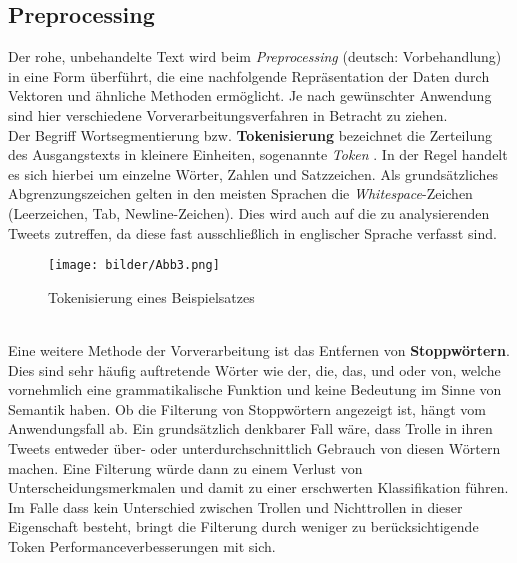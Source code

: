 \subsection{Preprocessing}
Der rohe, unbehandelte Text wird beim \textit{Preprocessing} (deutsch: Vorbehandlung) in eine Form überführt, die eine nachfolgende Repräsentation der Daten durch Vektoren und ähnliche Methoden ermöglicht. Je nach gewünschter Anwendung sind hier verschiedene Vorverarbeitungsverfahren in Betracht zu ziehen.\\
Der Begriff Wortsegmentierung bzw. \textbf{Tokenisierung} bezeichnet die Zerteilung des Ausgangstexts in kleinere Einheiten, sogenannte \textit{Token} \citep{MannSch99}. In der Regel handelt es sich hierbei um einzelne Wörter, Zahlen und Satzzeichen. Als grundsätzliches Abgrenzungszeichen gelten in den meisten Sprachen die \textit{Whitespace}-Zeichen (Leerzeichen, Tab, Newline-Zeichen). Dies wird auch auf die zu analysierenden Tweets zutreffen, da diese fast ausschließlich in englischer Sprache verfasst sind.\\
\begin{figure}[htb]
	\begin{center}
		\texttt{[image: bilder/Abb3.png]}
		\caption{Tokenisierung eines Beispielsatzes}\label{tokenization}
	\end{center}
\end{figure}\\
Eine weitere Methode der Vorverarbeitung ist das Entfernen von \textbf{Stoppwörtern}. Dies sind sehr häufig auftretende Wörter wie \glqq der\grqq, \glqq die\grqq, \glqq das\grqq, \glqq und\grqq{} oder \glqq von\grqq, welche vornehmlich eine grammatikalische Funktion und keine Bedeutung im Sinne von Semantik haben. Ob die Filterung von Stoppwörtern angezeigt ist, hängt vom Anwendungsfall ab. Ein grundsätzlich denkbarer Fall wäre, dass Trolle in ihren Tweets entweder über- oder unterdurchschnittlich Gebrauch von diesen Wörtern machen. Eine Filterung würde dann zu einem Verlust von Unterscheidungsmerkmalen und damit zu einer erschwerten Klassifikation führen. Im Falle dass kein Unterschied zwischen Trollen und Nichttrollen in dieser Eigenschaft besteht, bringt die Filterung durch weniger zu berücksichtigende Token Performanceverbesserungen mit sich.\\
